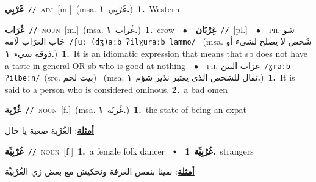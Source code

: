 \documentclass[10pt,a4paper,twoside]{article} %
\begin{document}
\begin{multicols}{2}
{{{{{{{{{\setlength\topsep{0pt}\textbf{\foreignlanguage{arabic}{غَرْبِي}}\ {\color{gray}\texttt{//}\color{black}}\ \textsc{adj}\ [m.]\ \color{gray}(msa. \foreignlanguage{arabic}{غَرْبِي}~\foreignlanguage{arabic}{\textbf{١.}})\color{black}\ \textbf{1.}~Western\ 

{\setlength\topsep{0pt}\textbf{\foreignlanguage{arabic}{غُرَاب}}\ {\color{gray}\texttt{//}\color{black}}\ \textsc{noun}\ [m.]\ \color{gray}(msa. \foreignlanguage{arabic}{غُراب}~\foreignlanguage{arabic}{\textbf{١.}})\color{black}\ \textbf{1.}~crow\ \ $\bullet$\ \ \setlength\topsep{0pt}\textbf{\foreignlanguage{arabic}{غِرْبَان}}\ {\color{gray}\texttt{//}\color{black}}\ [pl.]\ \ $\bullet$\ \ \textsc{ph.} \color{gray} \foreignlanguage{arabic}{شو جَاب الغرَاب لَامه}\color{black}\ {\color{gray}\texttt{/{\sffamily ʃuː (dʒ)aːb ʔilɣuraːb lammo}/}\color{black}}\ \color{gray} (msa. \foreignlanguage{arabic}{شَخص لا يصلح لشيء أو ذوقه سيء}~\foreignlanguage{arabic}{\textbf{١.}})\color{black}\ \textbf{1.}~It is an idiomatic expression that means that sb does not have a taste in general OR sb who is good at nothing\ \ $\bullet$\ \ \textsc{ph.} \color{gray} \foreignlanguage{arabic}{غرَاب البين}\color{black}\ {\color{gray}\texttt{/{\sffamily ɣraːb ʔilbeːn}/}\color{black}}\ \color{gray}(src. \foreignlanguage{arabic}{بيت لحم})\color{black}\ \color{gray} (msa. \foreignlanguage{arabic}{تقال للشخص الذي يعتبر نذير شؤم}~\foreignlanguage{arabic}{\textbf{١.}})\color{black}\ \textbf{1.}~It is said to a person who is considered ominous.  \textbf{2.}~a bad omen\ 

{\setlength\topsep{0pt}\textbf{\foreignlanguage{arabic}{غُرْبِة}}\ {\color{gray}\texttt{//}\color{black}}\ \textsc{noun}\ [f.]\ \color{gray}(msa. \foreignlanguage{arabic}{غُربَة}~\foreignlanguage{arabic}{\textbf{١.}})\color{black}\ \textbf{1.}~the state of being an expat\  \begin{flushright}\color{gray}\foreignlanguage{arabic}{\textbf{\underline{\foreignlanguage{arabic}{أمثلة}}}: الغُرْبِة صعبة يا خال}\end{flushright}\color{black}} \vspace{2mm}

{\setlength\topsep{0pt}\textbf{\foreignlanguage{arabic}{غُرْبِيِّة}}\ {\color{gray}\texttt{//}\color{black}}\ \textsc{noun}\ [f.]\ \textbf{1.}~a female folk dancer\ \ $\smblkdiamond$\ \ \setlength\topsep{0pt}\textbf{\foreignlanguage{arabic}{غُرْبِيِّة}}\ \textbf{1.}~strangers\  \begin{flushright}\color{gray}\foreignlanguage{arabic}{\textbf{\underline{\foreignlanguage{arabic}{أمثلة}}}: بقينا بنفس الغرفة ونحكيش مع بعض زي الغُرْبِيِّة}\end{flushright}\color{black}} \vspace{2mm}

}}}}}}}}}}
\end{multicols}
\end{document}
